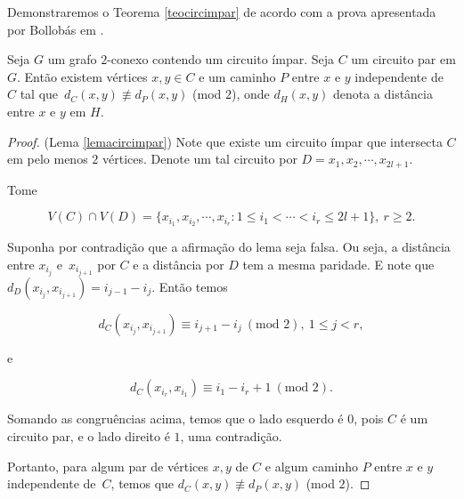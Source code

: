 Demonstraremos o Teorema \ref{teocircimpar} de acordo com a prova apresentada por Bollobás em \cite{bollobas2004extremal}.

\begin{lema}\label{lemacircimpar}
Seja $G$ um grafo $2$-conexo contendo um circuito ímpar. Seja $C$ um circuito par em $G$. Então existem vértices $x,y \in C$ e um caminho $P$ entre $x$ e $y$ independente de $C$ tal que~$d_C(x,y) \not\equiv d_P(x,y)$ (mod $2$), onde $d_H(x,y)$ denota a distância entre $x$ e $y$ em $H$.
\end{lema}

\begin{proof}(Lema \ref{lemacircimpar})
Note que existe um circuito ímpar que intersecta $C$ em pelo menos $2$ vértices. Denote um tal circuito por $D = x_1, x_2, \cdots, x_{2l+1}$.

Tome

\[V(C) \cap V(D) = \{x_{i_1}, x_{i_2}, \cdots, x_{i_r} : 1\leq i_1 < \cdots < i_r \leq 2l+1 \},\ r\geq 2.\]

Suponha por contradição que a afirmação do lema seja falsa. Ou seja, a distância entre $x_{i_j}$ e~$x_{i_{j+1}}$ por $C$ e a distância por $D$ tem a mesma paridade. E note que $d_D(x_{i_j}, x_{i_{j+1}}) = i_{j-1} - i_j$. Então temos

\[d_C(x_{i_j}, x_{i_{j+1}}) \equiv i_{j+1} - i_j\ (\text{mod } 2),\ 1\leq j< r,\]

e

\[d_C(x_{i_r}, x_{i_1}) \equiv i_1 - i_r + 1\ (\text{mod } 2).\]

Somando as congruências acima, temos que o lado esquerdo é $0$, pois $C$ é um circuito par, e o lado direito é $1$, uma contradição.

Portanto, para algum par de vértices $x,y$ de $C$ e algum caminho $P$ entre $x$ e $y$ independente de~$C$, temos que $d_C(x,y) \not\equiv d_P(x,y)$ (mod $2$).
\end{proof}

